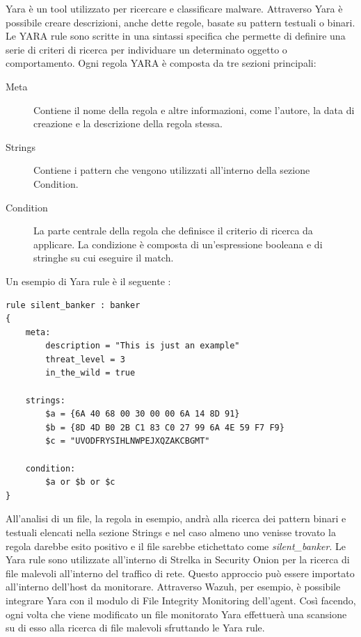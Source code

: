 \smallskip
Yara \cite{yara} è un tool utilizzato per ricercare e classificare malware. Attraverso Yara è possibile creare descrizioni, anche dette regole, basate su pattern testuali o binari.
Le YARA rule sono scritte in una sintassi specifica che permette di definire una serie di criteri di ricerca per individuare un determinato oggetto o comportamento. Ogni regola YARA è composta da tre sezioni principali:
\begin{description}
    \item [Meta] Contiene il nome della regola e altre informazioni, come l'autore, la data di creazione e la descrizione della regola stessa.
    \item [Strings] Contiene i pattern che vengono utilizzati all'interno della sezione Condition.
    \item [Condition] La parte centrale della regola che definisce il criterio di ricerca da applicare. La condizione è composta di un'espressione booleana e di stringhe su cui eseguire il match.
\end{description}

Un esempio di Yara rule è il seguente \cite{yaraexample}:
\begin{lstlisting}[caption={Esempio di Yara rule.},captionpos=b,frame=single]
rule silent_banker : banker
{
    meta:
        description = "This is just an example"
        threat_level = 3
        in_the_wild = true

    strings:
        $a = {6A 40 68 00 30 00 00 6A 14 8D 91}
        $b = {8D 4D B0 2B C1 83 C0 27 99 6A 4E 59 F7 F9}
        $c = "UVODFRYSIHLNWPEJXQZAKCBGMT"

    condition:
        $a or $b or $c
}
\end{lstlisting}


All'analisi di un file, la regola in esempio, andrà alla ricerca dei pattern binari e testuali elencati nella sezione Strings e nel caso almeno uno venisse trovato la regola darebbe esito positivo e il file sarebbe etichettato come \textit{silent\_banker}.
\smallskip
Le Yara rule sono utilizzate all'interno di Strelka in Security Onion per la ricerca di file malevoli all'interno del traffico di rete. Questo approccio può essere importato all'interno dell'host da monitorare. Attraverso Wazuh, per esempio, è possibile integrare Yara con il modulo di File Integrity Monitoring dell'agent. Così facendo, ogni volta che viene modificato un file monitorato Yara effettuerà una scansione su di esso alla ricerca di file malevoli sfruttando le Yara rule.

